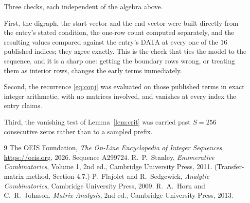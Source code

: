\documentclass[11pt,a4paper]{article}
\theoremstyle{plain}
\theoremstyle{definition}
\begin{document}
Three checks, each independent of the algebra above.

First, the digraph, the start vector and the end vector were built directly from the
entry's stated condition, the one-row count computed separately, and the resulting values
compared against the entry's DATA at every one of the $16$ published indices; they
agree exactly. This is the check that ties the model to the sequence, and it is a sharp one:
getting the boundary rows wrong, or treating them as interior rows, changes the early terms
immediately.

Second, the recurrence \eqref{eq:conj} was evaluated on those published terms in exact
integer arithmetic, with no matrices involved, and vanishes at every index the entry claims.

Third, the vanishing test of Lemma~\ref{lem:crit} was carried past $S=256$ consecutive
zeros rather than to a sampled prefix.

\begin{thebibliography}{9}
 The OEIS Foundation, \emph{The On-Line Encyclopedia of Integer
Sequences}, \url{https://oeis.org}, 2026. Sequence A299724.
 R.~P.~Stanley, \emph{Enumerative Combinatorics}, Volume 1, 2nd ed.,
Cambridge University Press, 2011. (Transfer-matrix method, Section 4.7.)
 P.~Flajolet and R.~Sedgewick, \emph{Analytic Combinatorics}, Cambridge
University Press, 2009.
 R.~A.~Horn and C.~R.~Johnson, \emph{Matrix Analysis}, 2nd ed., Cambridge
University Press, 2013.
\end{thebibliography}
\end{document}
